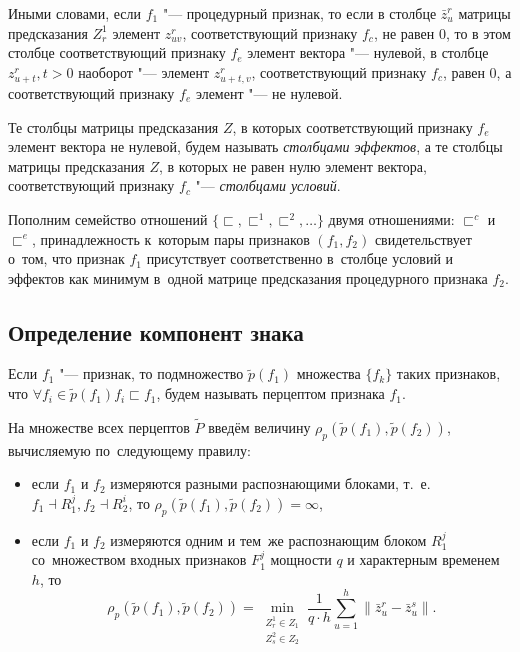 Иными словами, если $f_1$ "--- процедурный признак, то если в столбце $\bar z_u^r$ матрицы предсказания $Z_r^1$ элемент $z_{uv}^r$, соответствующий признаку $f_c$, не равен $0$, то в этом столбце соответствующий признаку $f_e$ элемент вектора "--- нулевой, в столбце $z_{u+t}^r, t>0$ наоборот "--- элемент $z_{u+t,v}^r$, соответствующий признаку $f_c$, равен $0$, а соответствующий признаку $f_e$ элемент "--- не нулевой.

\begin{Def}
	Те столбцы матрицы предсказания $Z$, в которых соответствующий признаку $f_e$ элемент вектора не нулевой, будем называть \textit{столбцами эффектов}, а те столбцы матрицы предсказания $Z$, в которых не равен нулю элемент вектора, соответствующий признаку $f_c$ "--- \textit{столбцами условий}. 
\end{Def}

Пополним семейство отношений $\{\sqsubset,\sqsubset^1,\sqsubset^2,\dots\}$ двумя отношениями: $\sqsubset^c$ и $\sqsubset^e$, принадлежность к~которым пары признаков $(f_1,f_2)$ свидетельствует о~том, что признак $f_1$ присутствует соответственно в~столбце условий и эффектов как минимум в~одной матрице предсказания процедурного признака $f_2$.

\subsection{Определение компонент знака}

\begin{Def}
	Если $f_1$ "--- признак, то подмножество $\tilde p(f_1)$ множества $\{f_k\}$ таких признаков, что $\forall f_i\in\tilde p(f_1) f_i\sqsubset f_1$, будем называть перцептом признака $f_1$.
\end{Def}

На множестве всех перцептов $\tilde P$ введём величину $\rho_p(\tilde p(f_1),\tilde p(f_2))$, вычисляемую по~следующему правилу:
\begin{itemize}
	\item если $f_1$ и $f_2$ измеряются разными распознающими блоками, т.~е. $f_1\dashv R_1^j, f_2\dashv R_2^i$, то $\rho_p(\tilde p(f_1),\tilde p(f_2))=\infty$,
	\item если $f_1$ и $f_2$ измеряются одним и тем~же распознающим блоком $R_1^j$ со~множеством входных признаков $F_1^j$ мощности $q$ и характерным временем $h$, то
	\begin{equation}
		\rho_p(\tilde p(f_1),\tilde p(f_2))=\min\limits_{\substack{Z_r^1\in Z_1\\Z_s^2\in Z_2}}\frac{1}{q\cdot h}\sum\limits_{u=1}^h\|\bar z_u^r-\bar z_u^s\|.
	\end{equation} 
\end{itemize}

